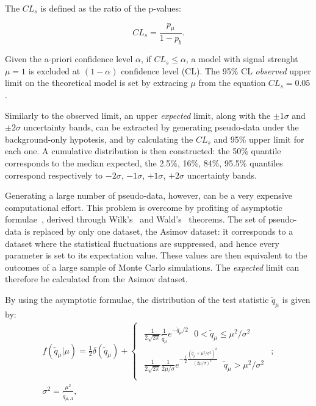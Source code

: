 \noindent The $CL_s$ is defined as the ratio of the p-values:

\begin{equation}
CL_s = \frac{ p_{\mu} }{ 1 - p_b}.
\end{equation}

\noindent Given the a-priori confidence level $\alpha$, if $CL_s \leq \alpha$, a model with signal strenght $\mu = 1$ is excluded at $(1 - \alpha)$ confidence level (CL). The 95\% CL \emph{observed} upper limit on the theoretical model is set by extracing $\mu$ from the equation $CL_s = 0.05$.

\noindent Similarly to the observed limit, an upper \emph{expected} limit, along with the $\pm 1 \sigma$ and $\pm 2 \sigma$ uncertainty bands, can be extracted by generating pseudo-data under the background-only hypotesis, and by calculating the $CL_s$ and 95\% upper limit for each one. A cumulative distribution is then constructed: the 50\% quantile corresponds to the median expected, the 2.5\%, 16\%, 84\%, 95.5\% quantiles correspond respectively to $-2 \sigma$, $-1 \sigma$, $+1 \sigma$, $+2 \sigma$ uncertainty bands.

\noindent Generating a large number of pseudo-data, however, can be a very expensive computational effort. This problem is overcome by profiting of asymptotic formulae~\cite{bib:Asymptotic}, derived through Wilk's~\cite{bib:Wilks} and Wald's~\cite{10.2307/1990256} theorems. The set of pseudo-data is replaced by only one dataset, the Asimov dataset: it corresponds to a dataset where the statistical fluctuations are suppressed, and hence every parameter is set to its expectation value. These values are then equivalent to the outcomes of a large sample of Monte Carlo simulations. The \emph{expected} limit can therefore be calculated from the Asimov dataset.

\noindent By using the asymptotic formulae, the distribution of the test statistic $\tilde{q}_{\mu}$ is given by:
\begin{equation}
\begin{gathered}
f(\tilde{q}_{\mu}|\mu) = \frac{1}{2} \delta (\tilde{q}_{\mu}) + 
\left\{
\begin{array}{l}
\begin{gathered}
\frac{1}{2 \sqrt{2 \pi}} \frac{1}{\tilde{q}_{\mu}} e^{-\tilde{q}_{\mu}/2} \text{   } 0 < \tilde{q}_{\mu} \leq \mu^2 / \sigma^2\\
\frac{1}{2 \sqrt{2 \pi}} \frac{1}{2 \mu / \sigma} e^ {-\frac{1}{2} \frac{\left(\tilde{q}_{\mu}  + \mu^2 / \sigma^2 \right)^2}{\left( 2 \mu / \sigma \right)^2}  } \text{   } \tilde{q}_{\mu} > \mu^2 / \sigma^2\\
\end{gathered}
\end{array}
\right. ; \\
\sigma^2 = \frac{\mu^2}{ \tilde{q}_{\mu, A}},
\end{gathered}
\end{equation}


